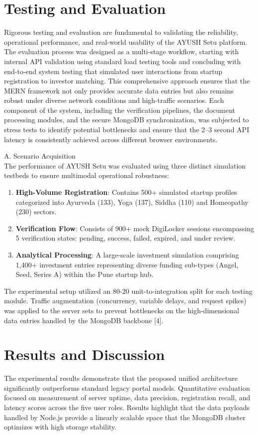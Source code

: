 \documentclass[conference]{IEEEtran}
\begin{document}
\section{Testing and Evaluation}
Rigorous testing and evaluation are fundamental to validating the reliability, operational performance, and real-world usability of the AYUSH Setu platform. The evaluation process was designed as a multi-stage workflow, starting with internal API validation using standard load testing tools and concluding with end-to-end system testing that simulated user interactions from startup registration to investor matching. This comprehensive approach ensures that the MERN framework not only provides accurate data entries but also remains robust under diverse network conditions and high-traffic scenarios. Each component of the system, including the verification pipelines, the document processing modules, and the secure MongoDB synchronization, was subjected to stress tests to identify potential bottlenecks and ensure that the 2--3 second API latency is consistently achieved across different browser environments.

A. Scenario Acquisition\\
The performance of AYUSH Setu was evaluated using three distinct simulation testbeds to ensure multimodal operational robustness:
\begin{enumerate}
    \item \textbf{High-Volume Registration}: Contains 500+ simulated startup profiles categorized into Ayurveda (133), Yoga (137), Siddha (110) and Homeopathy (230) sectors.
    \item \textbf{Verification Flow}: Consists of 900+ mock DigiLocker sessions encompassing 5 verification states: pending, success, failed, expired, and under review.
    \item \textbf{Analytical Processing}: A large-scale investment simulation comprising 1,400+ investment entries representing diverse funding sub-types (Angel, Seed, Series A) within the Pune startup hub.
\end{enumerate}
The experimental setup utilized an 80-20 unit-to-integration split for each testing module. Traffic augmentation (concurrency, variable delays, and request spikes) was applied to the server sets to prevent bottlenecks on the high-dimensional data entries handled by the MongoDB backbone [4].
\vspace{-0.5em}

\section{Results and Discussion}
The experimental results demonstrate that the proposed unified architecture significantly outperforms standard legacy portal models. Quantitative evaluation focused on measurement of server uptime, data precision, registration recall, and latency scores across the five user roles. Results highlight that the data payloads handled by Node.js provide a linearly scalable space that the MongoDB cluster optimizes with high storage stability.
\end{document}
